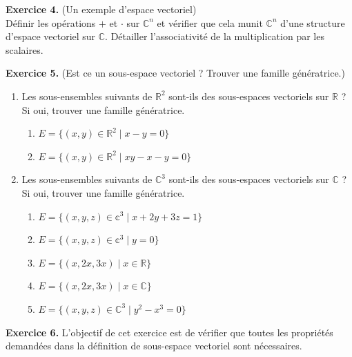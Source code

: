 \documentclass[a4paper, 10pt]{report}
\begin{document}
	\fancyhf{}
	\renewcommand{\headrule}
	{\rule{\textwidth}{0pt}}
	
	\noindent
	\textbf{Exercice 4.} (Un exemple d'espace vectoriel)\\
	Définir les opérations $+$ et $\cdot$ sur $\mathbb{C}^n$ et
	vérifier que cela munit $\mathbb{C}^n$ d'une structure d'espace
	vectoriel sur $\mathbb{C}$. Détailler l'associativité de la
	multiplication par les scalaires.
	
	\vspace{5mm}
	\noindent
	\textbf{Exercice 5.} (Est ce un sous-espace vectoriel ?
	Trouver une famille génératrice.)
	
	\begin{enumerate}[label=\arabic*.]
		\item Les sous-ensembles suivants de $\mathbb{R}^2$ sont-ils
		des sous-espaces vectoriels sur $\mathbb{R}$ ? Si oui, trouver
		une famille génératrice.
		\begin{enumerate}[label=(\alph*)]
			\item $E = \{(x, y) \in \mathbb{R}^2 \mid x - y = 0\}$
			\item $E = \{(x, y) \in \mathbb{R}^2 \mid xy - x - y = 0\}$
		\end{enumerate}
		\item Les sous-ensembles suivants de $\mathbb{C}^3$ sont-ils
		des sous-espaces vectoriels sur $\mathbb{C}$ ? Si oui, trouver
		une famille génératrice.
		\begin{enumerate}[label=(\alph*)]
			\item $E = \{(x, y, z) \in \mathbb{c}^3 \mid x + 2y + 3z = 1\}$
			\item $E = \{(x, y, z) \in \mathbb{c}^3 \mid y = 0\}$
			\item $E = \{(x, 2x, 3x) \mid x \in \mathbb{R}\}$
			\item $E = \{(x, 2x, 3x) \mid x \in \mathbb{C}\}$
			\item $E = \{(x, y, z) \in \mathbb{C}^3 \mid y^2 -x^3 = 0\}$
		\end{enumerate}
	\end{enumerate}
	
	\vspace{5mm}
	\noindent
	\textbf{Exercice 6.} L’objectif de cet exercice est de
	vérifier que toutes les propriétés demandées dans la définition
	de sous-espace vectoriel sont nécessaires.
	
\end{document}
